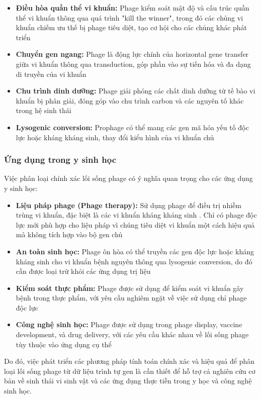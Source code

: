 \begin{itemize}
    \item \textbf{Điều hòa quần thể vi khuẩn:} Phage kiểm soát mật độ và cấu trúc quần thể vi khuẩn thông qua quá trình "kill the winner", trong đó các chủng vi khuẩn chiếm ưu thế bị phage tiêu diệt, tạo cơ hội cho các chủng khác phát triển \cite{koskella2014bacteria}

    \item \textbf{Chuyển gen ngang:} Phage là động lực chính của horizontal gene transfer giữa vi khuẩn thông qua transduction, góp phần vào sự tiến hóa và đa dạng di truyền của vi khuẩn

    \item \textbf{Chu trình dinh dưỡng:} Phage giải phóng các chất dinh dưỡng từ tế bào vi khuẩn bị phân giải, đóng góp vào chu trình carbon và các nguyên tố khác trong hệ sinh thái

    \item \textbf{Lysogenic conversion:} Prophage có thể mang các gen mã hóa yếu tố độc lực hoặc kháng kháng sinh, thay đổi kiểu hình của vi khuẩn chủ
\end{itemize}

\subsubsection{Ứng dụng trong y sinh học}

Việc phân loại chính xác lối sống phage có ý nghĩa quan trọng cho các ứng dụng y sinh học:

\begin{itemize}
    \item \textbf{Liệu pháp phage (Phage therapy):} Sử dụng phage để điều trị nhiễm trùng vi khuẩn, đặc biệt là các vi khuẩn kháng kháng sinh \cite{gorski2016phage,azimi2019phage}. Chỉ có phage độc lực mới phù hợp cho liệu pháp vì chúng tiêu diệt vi khuẩn một cách hiệu quả mà không tích hợp vào bộ gen chủ

    \item \textbf{An toàn sinh học:} Phage ôn hòa có thể truyền các gen độc lực hoặc kháng kháng sinh cho vi khuẩn bệnh nguyên thông qua lysogenic conversion, do đó cần được loại trừ khỏi các ứng dụng trị liệu \cite{cobian2016viruses}

    \item \textbf{Kiểm soát thực phẩm:} Phage được sử dụng để kiểm soát vi khuẩn gây bệnh trong thực phẩm, với yêu cầu nghiêm ngặt về việc sử dụng chỉ phage độc lực

    \item \textbf{Công nghệ sinh học:} Phage được sử dụng trong phage display, vaccine development, và drug delivery, với các yêu cầu khác nhau về lối sống phage tùy thuộc vào ứng dụng cụ thể
\end{itemize}

Do đó, việc phát triển các phương pháp tính toán chính xác và hiệu quả để phân loại lối sống phage từ dữ liệu trình tự gen là cần thiết để hỗ trợ cả nghiên cứu cơ bản về sinh thái vi sinh vật và các ứng dụng thực tiễn trong y học và công nghệ sinh học.
